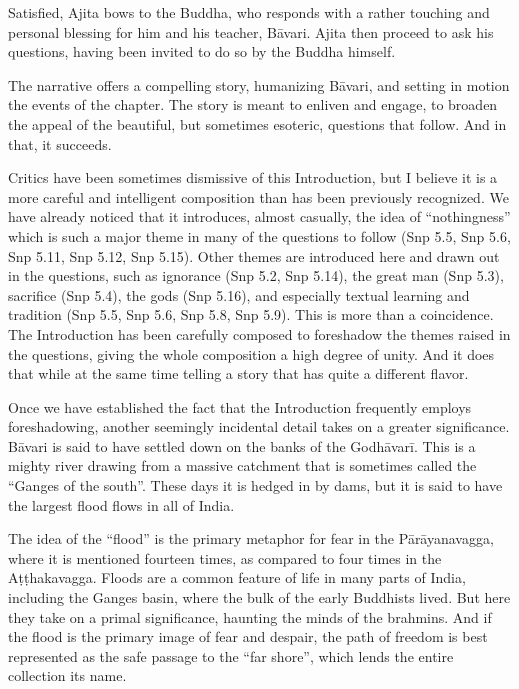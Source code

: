 \documentclass[12pt,openany]{book}%
\begin{document}
Satisfied, Ajita bows to the Buddha, who responds with a rather touching and personal blessing for him and his teacher, \textsanskrit{Bāvari}. Ajita then proceed to ask his questions, having been invited to do so by the Buddha himself.

The narrative offers a compelling story, humanizing \textsanskrit{Bāvari}, and setting in motion the events of the chapter. The story is meant to enliven and engage, to broaden the appeal of the beautiful, but sometimes esoteric, questions that follow. And in that, it succeeds.

Critics have been sometimes dismissive of this Introduction, but I believe it is a more careful and intelligent composition than has been previously recognized. We have already noticed that it introduces, almost casually, the idea of “nothingness” which is such a major theme in many of the questions to follow (Snp 5.5, Snp 5.6, Snp 5.11, Snp 5.12, Snp 5.15). Other themes are introduced here and drawn out in the questions, such as ignorance (Snp 5.2, Snp 5.14), the great man (Snp 5.3), sacrifice (Snp 5.4), the gods (Snp 5.16), and especially textual learning and tradition (Snp 5.5, Snp 5.6, Snp 5.8, Snp 5.9). This is more than a coincidence. The Introduction has been carefully composed to foreshadow the themes raised in the questions, giving the whole composition a high degree of unity. And it does that while at the same time telling a story that has quite a different flavor.

Once we have established the fact that the Introduction frequently employs foreshadowing, another seemingly incidental detail takes on a greater significance. \textsanskrit{Bāvari} is said to have settled down on the banks of the \textsanskrit{Godhāvarī}. This is a mighty river drawing from a massive catchment that is sometimes called the “Ganges of the south”. These days it is hedged in by dams, but it is said to have the largest flood flows in all of India.

The idea of the “flood” is the primary metaphor for fear in the \textsanskrit{Pārāyanavagga}, where it is mentioned fourteen times, as compared to four times in the \textsanskrit{Aṭṭhakavagga}. Floods are a common feature of life in many parts of India, including the Ganges basin, where the bulk of the early Buddhists lived. But here they take on a primal significance, haunting the minds of the brahmins. And if the flood is the primary image of fear and despair, the path of freedom is best represented as the safe passage to the “far shore”, which lends the entire collection its name.
\end{document}
